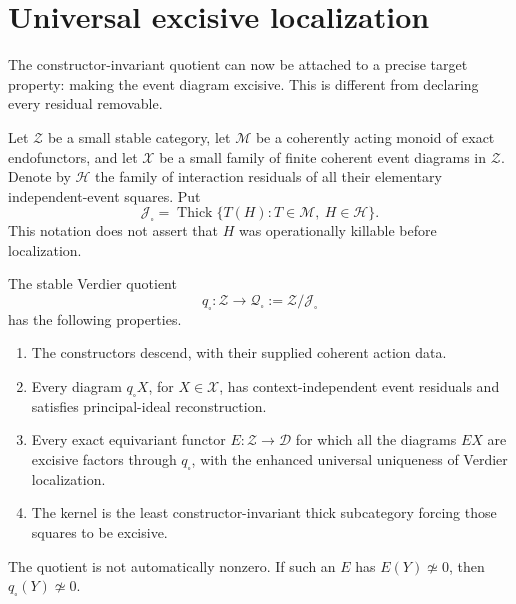 \section{Universal excisive localization}\label{sec:excisive-localization}

The constructor-invariant quotient can now be attached to a precise target property: making the event diagram excisive. This is different from declaring every residual removable.

Let $\mathcal Z$ be a small stable category, let $\mathscr M$ be a coherently acting monoid of exact endofunctors, and let $\mathscr X$ be a small family of finite coherent event diagrams in $\mathcal Z$. Denote by $\mathscr H$ the family of interaction residuals of all their elementary independent-event squares. Put
\[
 \mathcal J_{\square}
 =\operatorname{Thick}\{T(H):T\in\mathscr M,\ H\in\mathscr H\}.
\]
This notation does not assert that $H$ was operationally killable before localization.

\begin{theorem}\label{thm:excisive-quotient}
The stable Verdier quotient
\[
 q_{\square}:\mathcal Z\longrightarrow\mathcal Q_{\square}
 :=\mathcal Z/\mathcal J_{\square}
\]
has the following properties.
\begin{enumerate}
\item The constructors descend, with their supplied coherent action data.
\item Every diagram $q_{\square}X$, for $X\in\mathscr X$, has context-independent event residuals and satisfies principal-ideal reconstruction.
\item Every exact equivariant functor $E:\mathcal Z\to\mathcal D$ for which all the diagrams $EX$ are excisive factors through $q_{\square}$, with the enhanced universal uniqueness of Verdier localization.
\item The kernel is the least constructor-invariant thick subcategory forcing those squares to be excisive.
\end{enumerate}
The quotient is not automatically nonzero. If such an $E$ has $E(Y)\not\simeq0$, then $q_{\square}(Y)\not\simeq0$.
\end{theorem}

